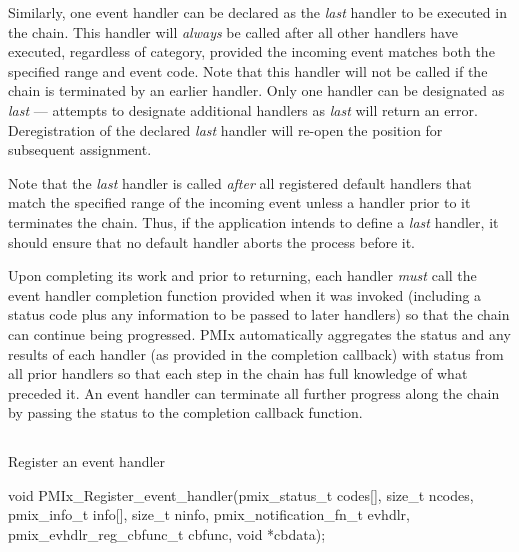 Similarly, one event handler can be declared as the \textit{last} handler to be executed in the chain. This handler will \textit{always} be called after all other handlers have executed, regardless of category, provided the incoming event matches both the specified range and event code. Note that this handler will not be called if the chain is terminated by an earlier handler. Only one handler can be designated as \textit{last} --- attempts to designate additional handlers as \textit{last} will return an error. Deregistration of the declared \textit{last} handler will re-open the position for subsequent assignment.

\adviceuserstart
Note that the \textit{last} handler is called \textit{after} all registered default handlers that match the specified range of the incoming event unless a handler prior to it terminates the chain. Thus, if the application intends to define a \textit{last} handler, it should ensure that no default handler aborts the process before it.
\adviceuserend

Upon completing its work and prior to returning, each handler \textit{must} call the event handler completion function provided when it was invoked (including a status code plus any information to be passed to later handlers) so that the chain can continue being progressed. \ac{PMIx} automatically aggregates the status and any results of each handler (as provided in the completion callback) with status from all prior handlers so that each step in the chain has full knowledge of what preceded it. An event handler can terminate all further progress along the chain by passing the  status to the completion callback function.


\subsection{}

\summary

Register an event handler

\format

\cspecificstart
\begin{codepar}
void
PMIx_Register_event_handler(pmix_status_t codes[], size_t ncodes,
                            pmix_info_t info[], size_t ninfo,
                            pmix_notification_fn_t evhdlr,
                            pmix_evhdlr_reg_cbfunc_t cbfunc,
                            void *cbdata);
\end{codepar}
\cspecificend

